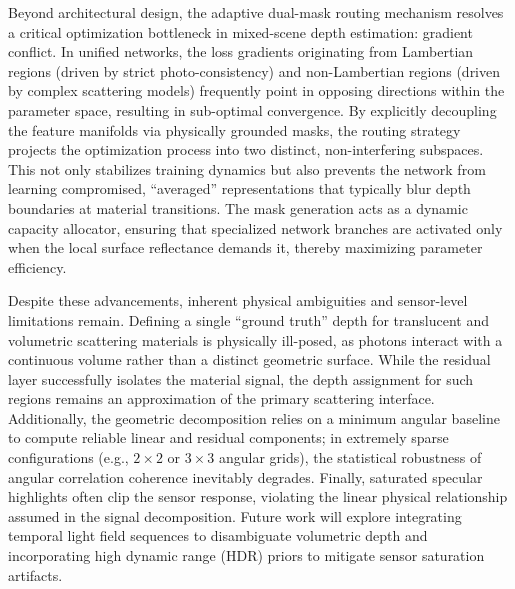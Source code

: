 \documentclass[lettersize,journal]{IEEEtran}
\begin{document}
Beyond architectural design, the adaptive dual-mask routing mechanism resolves a critical optimization bottleneck in mixed-scene depth estimation: gradient conflict. In unified networks, the loss gradients originating from Lambertian regions (driven by strict photo-consistency) and non-Lambertian regions (driven by complex scattering models) frequently point in opposing directions within the parameter space, resulting in sub-optimal convergence. By explicitly decoupling the feature manifolds via physically grounded masks, the routing strategy projects the optimization process into two distinct, non-interfering subspaces. This not only stabilizes training dynamics but also prevents the network from learning compromised, ``averaged'' representations that typically blur depth boundaries at material transitions. The mask generation acts as a dynamic capacity allocator, ensuring that specialized network branches are activated only when the local surface reflectance demands it, thereby maximizing parameter efficiency.

Despite these advancements, inherent physical ambiguities and sensor-level limitations remain. Defining a single ``ground truth'' depth for translucent and volumetric scattering materials is physically ill-posed, as photons interact with a continuous volume rather than a distinct geometric surface. While the residual layer successfully isolates the material signal, the depth assignment for such regions remains an approximation of the primary scattering interface. Additionally, the geometric decomposition relies on a minimum angular baseline to compute reliable linear and residual components; in extremely sparse configurations (e.g., $2 \times 2$ or $3 \times 3$ angular grids), the statistical robustness of angular correlation coherence inevitably degrades. Finally, saturated specular highlights often clip the sensor response, violating the linear physical relationship assumed in the signal decomposition. Future work will explore integrating temporal light field sequences to disambiguate volumetric depth and incorporating high dynamic range (HDR) priors to mitigate sensor saturation artifacts.
\end{document}
